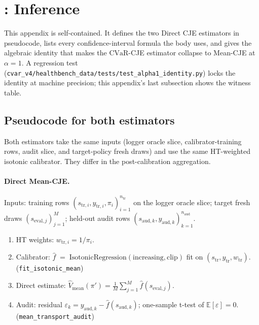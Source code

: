 \documentclass[11pt]{article}
\newcommand{\E}{\mathbb{E}}
\newcommand{\CVaR}{\mathrm{CVaR}}
\begin{document}
\section{: Inference}
\label{app:inference}

This appendix is self-contained. It defines the two Direct CJE estimators
in pseudocode, lists every confidence-interval formula the body uses,
and gives the algebraic identity that makes the $\CVaR$-CJE estimator
collapse to Mean-CJE at $\alpha = 1$. A regression test
(\texttt{cvar\_v4/healthbench\_data/tests/test\_alpha1\_identity.py})
locks the identity at machine precision; this appendix's last subsection
shows the witness table.

\subsection{Pseudocode for both estimators}
\label{app:pseudocode}

Both estimators take the same inputs (logger oracle slice,
calibrator-training rows, audit slice, and target-policy fresh draws)
and use the same HT-weighted isotonic calibrator. They differ in the
post-calibration aggregation.

\paragraph{Direct Mean-CJE.}
Inputs: training rows $(s_{\mathrm{tr},i}, y_{\mathrm{tr},i}, \pi_i)_{i=1}^{n_{\mathrm{tr}}}$
on the logger oracle slice; target fresh draws $(s_{\mathrm{eval},j})_{j=1}^{M}$;
held-out audit rows $(s_{\mathrm{aud},k}, y_{\mathrm{aud},k})_{k=1}^{n_{\mathrm{aud}}}$.

\begin{enumerate}
\item[\textbf{M-1.}] HT weights: $w_{\mathrm{tr},i} = 1 / \pi_i$.
\item[\textbf{M-2.}] Calibrator: $\hat f \;=\; \mathrm{IsotonicRegression}(\text{increasing}, \text{clip})$
  fit on $(s_{\mathrm{tr}}, y_{\mathrm{tr}}, w_{\mathrm{tr}})$. (\texttt{fit\_isotonic\_mean})
\item[\textbf{M-3.}] Direct estimate: $\widehat{V}_{\mathrm{mean}}(\pi') = \frac{1}{M} \sum_{j=1}^{M} \hat f(s_{\mathrm{eval},j})$.
\item[\textbf{M-4.}] Audit: residual $\varepsilon_k = y_{\mathrm{aud},k} - \hat f(s_{\mathrm{aud},k})$;
  one-sample t-test of $\E[\varepsilon] = 0$. (\texttt{mean\_transport\_audit})
\end{enumerate}
\end{document}
